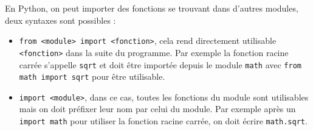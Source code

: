 \documentclass[11pt,a4paper]{article}
\begin{document}
	\begin{tcolorbox}[left=0cm,title=\bf{\faPython \; Importation de fonctions},colbacktitle=cfond]
		En Python, on peut importer des fonctions se trouvant dans d'autres modules, deux syntaxes sont possibles :
		\begin{itemize}
			\item[\textbullet] {\tt from <module> import <fonction>}, cela rend directement utilisable {\tt <fonction>} dans la suite du programme. Par exemple la fonction racine carrée s'appelle \texttt{sqrt} et doit être importée depuis le module \texttt{math} avec \texttt{from math import sqrt} pour être utilisable.
			\item[\textbullet] {\tt import <module>}, dans ce cas, toutes les fonctions du module sont utilisables mais on doit préfixer leur nom par celui du module. Par exemple après un \texttt{import math} pour utiliser la fonction racine carrée, on doit écrire \texttt{math.sqrt}.
		\end{itemize}
	\end{tcolorbox}
	
\end{document}
